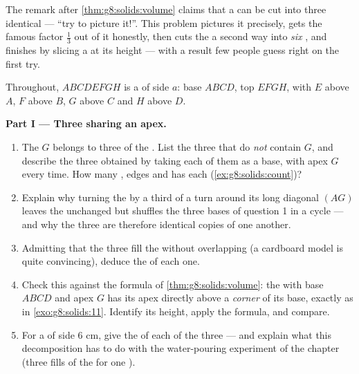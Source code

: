 \begin{problem}
\label{pb:g8:solids:1}
The remark after \cref{thm:g8:solids:volume} claims that a 
can be cut into three identical  --- ``try to picture
it!''. This problem pictures it precisely, gets the famous factor
$\frac13$ out of it honestly, then cuts the  a second way into
\emph{six} , and finishes by slicing a  at  its
height --- with a result few people guess right on the first try.

Throughout, $ABCDEFGH$ is a  of side $a$: base $ABCD$, top
 $EFGH$, with $E$ above $A$, $F$ above $B$, $G$ above $C$ and
$H$ above $D$.

\medskip
\noindent\textbf{Part I --- Three  sharing an apex.}
\begin{enumerate}
  \item The  $G$ belongs to three  of the . List
        the three  that do \emph{not} contain $G$, and
        describe the three  obtained by taking each of
        them as a base, with apex $G$ every time. How many ,
        edges and  has each 
        (\cref{ex:g8:solids:count})?
  \item Explain why turning the  by a third of a turn around
        its long diagonal $(AG)$ leaves the  unchanged but
        shuffles the three bases of question 1 in a cycle ---
        and why the three  are therefore identical
        copies of one another.
  \item Admitting that the three  fill the  without
        overlapping (a cardboard model is quite convincing),
        deduce the  of each one.
  \item Check this against the formula of
        \cref{thm:g8:solids:volume}: the  with base $ABCD$
        and apex $G$ has its apex directly above a \emph{corner}
        of its base, exactly as in \cref{exo:g8:solids:11}.
        Identify its height, apply the formula, and compare.
  \item For a  of side $6$ cm, give the  of each of the
        three  --- and explain what this decomposition
        has to do with the water-pouring experiment of the
        chapter (three fills of the  for one ).
\end{enumerate}


\end{problem}
